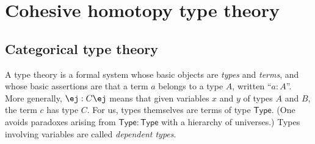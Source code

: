 \documentclass[copyright,12pt]{eptcs}
\makeatletter
\newcommand{\type}{\ensuremath{\mathsf{Type}}\xspace}
\def\jd#1{\@jd#1\ej}
\def\@jd#1|-#2\ej{\@@jd#1,,\;\vdash\;\left(#2\right)}
\def\@@jd#1,{\@ifmtarg{#1}{\let\next=\relax}{\left(#1\right)\let\next=\@@@jd}\next}
\def\@@@jd#1,{\@ifmtarg{#1}{\let\next=\relax}{,\,\left(#1\right)\let\next=\@@@jd}\next}
\makeatother
\begin{document}
\section{Cohesive homotopy type theory}
\label{sec:cohott}

\subsection{Categorical type theory}
\label{sec:type-theory}

A type theory is a formal system
whose basic objects are \emph{types} and \emph{terms},
and whose basic assertions are that a term $a$ belongs to a type $A$, written ``$a:A$''.
%
More generally, $\jd{x:A, y:B |- c:C}$ means that given variables $x$ and $y$ of types $A$ and $B$, the term $c$ has type $C$.
%
For us,
types themselves are terms of type \type.
(One avoids paradoxes arising from $\type:\type$ with a hierarchy of universes.)
%
%
Types involving variables are called \emph{dependent types}.
\end{document}
